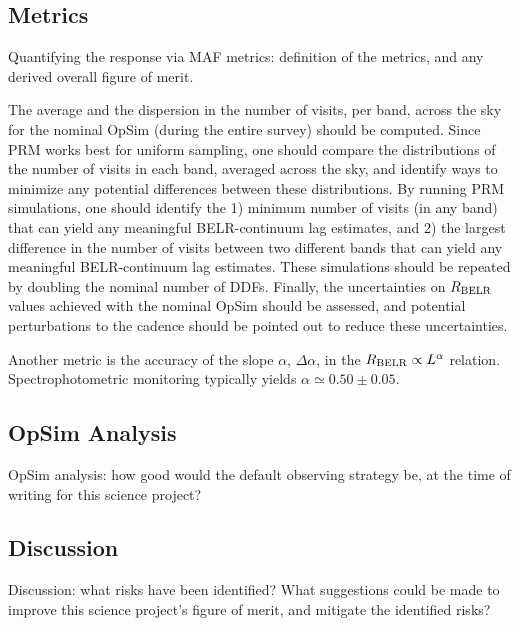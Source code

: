 
\subsection{Metrics}
\label{sec:\secname:metrics}

Quantifying the response via MAF metrics: definition of the metrics,
and any derived overall figure of merit.

The average and the dispersion in the number of visits, per band, across
the sky for the nominal OpSim (during the entire survey) should be computed.
Since PRM works best for uniform sampling, one should compare the distributions
of the number of visits in each band, averaged across the sky, and identify
ways to minimize any potential differences between these distributions. By
running PRM simulations, one should identify the 1) minimum number of visits
(in any band) that can yield any meaningful BELR-continuum lag estimates, and
2) the largest difference in the number of visits between two different bands
that can yield any meaningful BELR-continuum lag estimates. These simulations
should be repeated by doubling the nominal number of DDFs. Finally, the
uncertainties on $R_{\rm BELR}$ values achieved with the nominal OpSim
should be assessed, and potential perturbations to the cadence should be
pointed out to reduce these uncertainties.

Another metric is the accuracy of the slope $\alpha$, $\Delta \alpha$, in the
$R_{\rm BELR} \propto L^{\alpha}$ relation. Spectrophotometric monitoring
typically yields $\alpha \simeq 0.50 \pm 0.05$.


\subsection{OpSim Analysis}
\label{sec:\secname:analysis}

OpSim analysis: how good would the default observing strategy be, at
the time of writing for this science project?



\subsection{Discussion}
\label{sec:\secname:discussion}

Discussion: what risks have been identified? What suggestions could be
made to improve this science project's figure of merit, and mitigate
the identified risks?



\navigationbar
